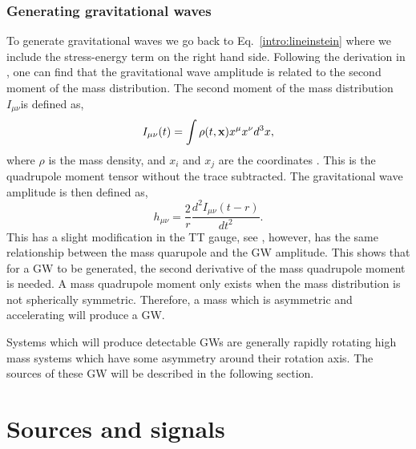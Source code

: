 \subsubsection{Generating gravitational waves}

To generate gravitational waves we go back to Eq.~\ref{intro:lineinstein} where we include the stress-energy term on the right hand side.
Following the derivation in \citep{flanagan2005BasicsGravitational}, one can find that the gravitational wave amplitude is related to the second moment of the mass distribution.
The second moment of the mass distribution $I_{\mu\nu}$is defined as,
\begin{equation}
    I_{\mu \nu}(t) = \int \rho(t,{\bf x}) x^\mu x^\nu d^3x,
\end{equation}
where $\rho$ is the mass density, and $x_i$ and $x_j$ are the coordinates \citep{flanagan2005BasicsGravitational}. 
This is the quadrupole moment tensor without the trace subtracted.
The gravitational wave amplitude is then defined as,
\begin{equation}
\label{intro:gravwave:amp}
    h_{\mu \nu} = \frac{2}{r}  \frac{d^2 I_{\mu \nu}(t-r)}{dt^2}.
\end{equation}
This has a slight modification in the TT gauge, see \citep{flanagan2005BasicsGravitational}, however, has the same relationship between the mass quarupole and the \ac{GW} amplitude.
This shows that for a \ac{GW} to be generated, the second derivative of the mass quadrupole moment is needed.
A mass quadrupole moment only exists when the mass distribution is not spherically symmetric.
Therefore, a mass which is asymmetric and accelerating will produce a \ac{GW}.

Systems which will produce detectable \acp{GW} are generally rapidly rotating high mass systems which have some asymmetry around their rotation axis.
The sources of these \ac{GW} will be described in the following section.



\section{\label{intro:sources}Sources and signals}

